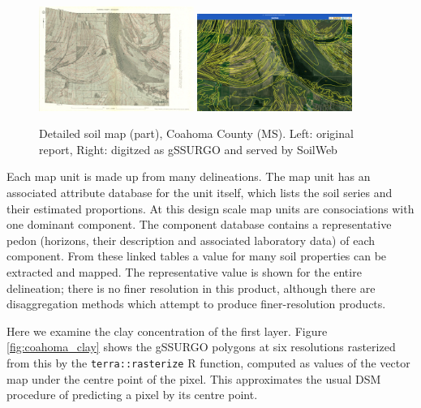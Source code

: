 \documentclass[soil, manuscript]{copernicus}
\begin{document}
\begin{figure}
  \includegraphics[width=0.45\textwidth]{usda-general-soil-map-of-coahoma-county-mississippi_Plate32.jpg}
  \hfill
  \includegraphics[width=0.45\textwidth]{SoilWeb_coahoma-county-mississipp_Plate32.png} 
 \caption{Detailed soil map (part), Coahoma County (MS). Left: original report, Right: digitzed as gSSURGO and served by SoilWeb}
  \label{fig:coahoma}
\end{figure}

%
\par
Each map unit is made up from many delineations. The map unit has an associated attribute database for the unit itself, which lists the soil series and their estimated proportions. At this design scale map units are consociations with one dominant component. The component database contains  a representative pedon (horizons, their description and associated laboratory data) of each  component.
%
From these linked tables a value for many soil properties can be extracted and mapped. 
%
The representative value is shown for the entire delineation; there is no finer resolution in this product, although there are disaggregation methods which attempt to produce finer-resolution products.

\par
Here we examine the clay concentration of the first layer.
%
Figure \ref{fig:coahoma_clay} shows the gSSURGO polygons at six resolutions rasterized from this by the \texttt{terra::rasterize} R function, computed as values of the vector map under the centre point of the  pixel.
%
This approximates the usual DSM procedure of predicting a pixel by its centre point.
\end{document}
